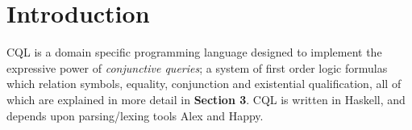 \section{Introduction}
CQL is a domain specific programming language designed to implement the expressive power of \textit{conjunctive queries}; a system of first order logic formulas which relation symbols, equality, conjunction and existential qualification, all of which are explained in more detail in \textbf{Section 3}. CQL is written in Haskell, and depends upon parsing/lexing tools Alex and Happy.
